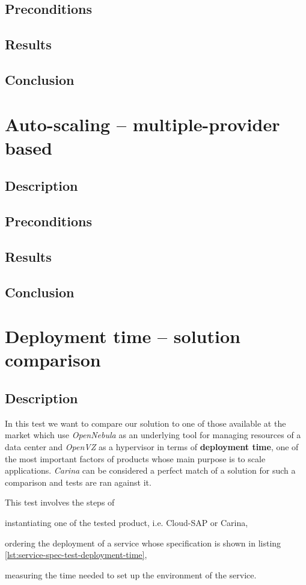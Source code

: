 \subsection*{Preconditions}
\subsection*{Results}
\subsection*{Conclusion}

\section{Auto-scaling -- multiple-provider based}
\subsection*{Description}
\subsection*{Preconditions}
\subsection*{Results}
\subsection*{Conclusion}

\section{Deployment time -- solution comparison}
\subsection*{Description}
In this test we want to compare our solution to one of those available at the market which use \emph{OpenNebula} as an underlying tool for managing resources of a data center and \emph{OpenVZ} as a hypervisor in terms of \textbf{deployment time}, one of the most important factors of products whose main purpose is to scale applications.
\emph{Carina} \cite{Carina} can be considered a perfect match of a solution for such a comparison and tests are ran against it.

This test involves the steps of
  \begin{inparaenum}[i)]
    \item instantiating one of the tested product, i.e. Cloud-SAP or Carina,
    \item ordering the deployment of a service whose specification is shown in listing \ref{lst:service-spec-test-deployment-time},
    \item measuring the time needed to set up the environment of the service.
  \end{inparaenum}

